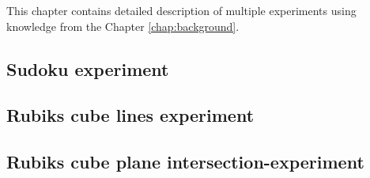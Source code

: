 \documentclass[../../main]{subfiles}
\begin{document}
This chapter contains detailed description of multiple experiments using knowledge from the Chapter \ref{chap:background}.

\subsection{Sudoku experiment}
\label{subsec:sudoku_experiment}

\newpage

\subsection{Rubiks cube lines experiment}

\newpage

\subsection{Rubiks cube plane intersection-experiment}

\newpage
\end{document}
